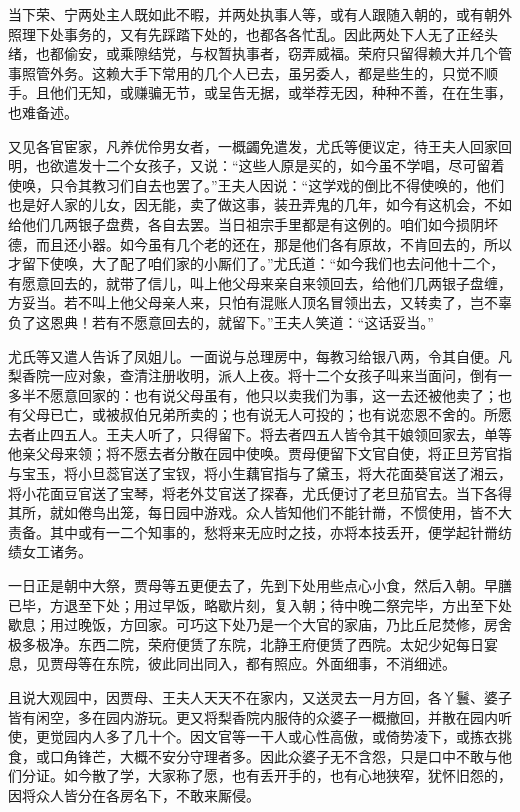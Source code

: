 \documentclass[12pt,oneside]{book}
\begin{document}
当下荣、宁两处主人既如此不暇，并两处执事人等，或有人跟随入朝的，或有朝外照理下处事务的，又有先踩踏下处的，也都各各忙乱。因此两处下人无了正经头绪，也都偷安，或乘隙结党，与权暂执事者，窃弄威福。荣府只留得赖大并几个管事照管外务。这赖大手下常用的几个人已去，虽另委人，都是些生的，只觉不顺手。且他们无知，或赚骗无节，或呈告无据，或举荐无因，种种不善，在在生事，也难备述。

又见各官宦家，凡养优伶男女者，一概蠲免遣发，尤氏等便议定，待王夫人回家回明，也欲遣发十二个女孩子，又说：“这些人原是买的，如今虽不学唱，尽可留着使唤，只令其教习们自去也罢了。”王夫人因说：“这学戏的倒比不得使唤的，他们也是好人家的儿女，因无能，卖了做这事，装丑弄鬼的几年，如今有这机会，不如给他们几两银子盘费，各自去罢。当日祖宗手里都是有这例的。咱们如今损阴坏德，而且还小器。如今虽有几个老的还在，那是他们各有原故，不肯回去的，所以才留下使唤，大了配了咱们家的小厮们了。”尤氏道：“如今我们也去问他十二个，有愿意回去的，就带了信儿，叫上他父母来亲自来领回去，给他们几两银子盘缠，方妥当。若不叫上他父母亲人来，只怕有混账人顶名冒领出去，又转卖了，岂不辜负了这恩典！若有不愿意回去的，就留下。”王夫人笑道：“这话妥当。”

尤氏等又遣人告诉了凤姐儿。一面说与总理房中，每教习给银八两，令其自便。凡梨香院一应对象，查清注册收明，派人上夜。将十二个女孩子叫来当面问，倒有一多半不愿意回家的：也有说父母虽有，他只以卖我们为事，这一去还被他卖了；也有父母已亡，或被叔伯兄弟所卖的；也有说无人可投的；也有说恋恩不舍的。所愿去者止四五人。王夫人听了，只得留下。将去者四五人皆令其干娘领回家去，单等他亲父母来领；将不愿去者分散在园中使唤。贾母便留下文官自使，将正旦芳官指与宝玉，将小旦蕊官送了宝钗，将小生藕官指与了黛玉，将大花面葵官送了湘云，将小花面豆官送了宝琴，将老外艾官送了探春，尤氏便讨了老旦茄官去。当下各得其所，就如倦鸟出笼，每日园中游戏。众人皆知他们不能针黹，不惯使用，皆不大责备。其中或有一二个知事的，愁将来无应时之技，亦将本技丢开，便学起针黹纺绩女工诸务。

一日正是朝中大祭，贾母等五更便去了，先到下处用些点心小食，然后入朝。早膳已毕，方退至下处；用过早饭，略歇片刻，复入朝；待中晚二祭完毕，方出至下处歇息；用过晚饭，方回家。可巧这下处乃是一个大官的家庙，乃比丘尼焚修，房舍极多极净。东西二院，荣府便赁了东院，北静王府便赁了西院。太妃少妃每日宴息，见贾母等在东院，彼此同出同入，都有照应。外面细事，不消细述。

且说大观园中，因贾母、王夫人天天不在家内，又送灵去一月方回，各丫鬟、婆子皆有闲空，多在园内游玩。更又将梨香院内服侍的众婆子一概撤回，并散在园内听使，更觉园内人多了几十个。因文官等一干人或心性高傲，或倚势凌下，或拣衣挑食，或口角锋芒，大概不安分守理者多。因此众婆子无不含怨，只是口中不敢与他们分证。如今散了学，大家称了愿，也有丢开手的，也有心地狭窄，犹怀旧怨的，因将众人皆分在各房名下，不敢来厮侵。
\end{document}
